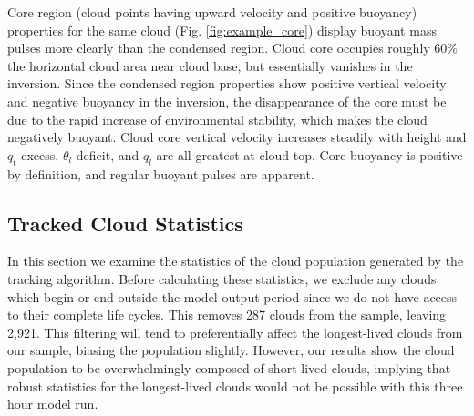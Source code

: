 \documentclass[acp]{copernicus}
\begin{document}
Core region (cloud points having upward velocity and positive buoyancy) 
properties for the same cloud (Fig. \ref{fig:example_core}) display buoyant 
mass pulses more clearly than the condensed region.  Cloud core occupies 
roughly 60\% the horizontal cloud area near cloud base, but essentially 
vanishes in the inversion.  Since the condensed region properties show positive 
vertical velocity and negative buoyancy in the inversion, the disappearance of 
the core must be due to the rapid increase of environmental stability, which 
makes the cloud negatively buoyant.  Cloud core vertical velocity increases 
steadily with height and $q_t$ excess, $\theta_l$ deficit, and $q_l$ are all 
greatest at cloud top.  Core buoyancy is positive by definition, and regular 
buoyant pulses are apparent.

\subsection{Tracked Cloud Statistics}

In this section we examine the statistics of the cloud population generated by 
the tracking algorithm.  Before calculating these statistics, we exclude any 
clouds which begin or end outside the model output period since we do not have 
access to their complete life cycles. This removes 287 clouds from the sample, 
leaving 2,921.  This filtering will tend to preferentially affect the 
longest-lived clouds from our sample, biasing the population slightly.  
However, our results show the cloud population to be overwhelmingly composed of 
short-lived clouds, implying that robust statistics for the longest-lived 
clouds would not be possible with this three hour model run.
\end{document}
